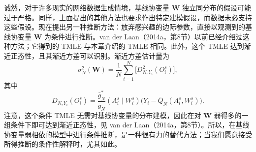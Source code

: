 诚然，对于许多现实的网络数据生成情境，基线协变量 $\bm W$ 独立同分布的假设可能过于严格。同样，上面提出的其他方法也要求作出特定建模假设，而数据未必支持这些假设。现在提出另一种推断方法：放弃感兴趣的边际参数，直接以观测到的基线协变量 $\bm W$ 为条件进行推断。van der Laan（2014a，第8节）以前已经介绍过这种方法；它得到的 TMLE 与本章介绍的 TMLE 相同。此外，这个 TMLE 达到渐近正态性，且其渐近方差可以识别。渐近方差估计量为
\[
 \sigma_N^2(\bm W)=\frac{1}{N}\sum_{i=1}^N
 \bigl[D_{N,Y_i}^2(O_i^s)\bigr],
\]
其中
\[
 D_{N,Y_i}(O_i^s)=\frac{\bar g_N^*}{\bar g_N}(A_i^s\mid W_i^s)
 \bigl(Y_i-\bar Q_N(A_i^s,W_i^s)\bigr).
\]
注意，这个条件 TMLE 无需对基线协变量的分布建模，因此在对 $\bm W$ 弱得多的一组条件下即可达到渐近正态性，见 van der Laan（2014a，第8节）。所以，在基线协变量弱相依的模型中进行条件推断，是一种很有力的替代方法；当我们愿意接受所得推断的条件性解释时，尤其如此。
